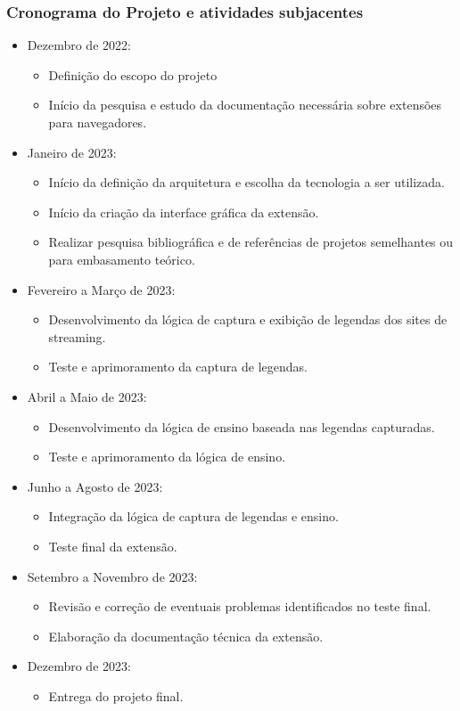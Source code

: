 \documentclass[12pt]{article}
\begin{document}
\subsubsection{Cronograma do Projeto e atividades subjacentes}
\begin{itemize}

\item Dezembro de 2022:
\begin{itemize}
\item Definição do escopo do projeto
\item Início da pesquisa e estudo da documentação necessária sobre extensões para navegadores.
\end{itemize}

\item Janeiro de 2023:
\begin{itemize}
\item Início da definição da arquitetura e escolha da tecnologia a ser utilizada.
\item Início da criação da interface gráfica da extensão.
\item Realizar pesquisa bibliográfica e de referências de projetos semelhantes ou para embasamento teórico.
\end{itemize}

\item Fevereiro a Março de 2023:
\begin{itemize}
\item Desenvolvimento da lógica de captura e exibição de legendas dos sites de streaming.
\item Teste e aprimoramento da captura de legendas.
\end{itemize}

\item Abril a Maio de 2023:
\begin{itemize}
\item Desenvolvimento da lógica de ensino baseada nas legendas capturadas.
\item Teste e aprimoramento da lógica de ensino.
\end{itemize}


\item Junho a Agosto de 2023:
\begin{itemize}
\item Integração da lógica de captura de legendas e ensino.
\item Teste final da extensão.
\end{itemize}

\item Setembro a Novembro de 2023:
\begin{itemize}
\item Revisão e correção de eventuais problemas identificados no teste final.
\item Elaboração da documentação técnica da extensão.
\end{itemize}


\item Dezembro de 2023:
\begin{itemize}
\item Entrega do projeto final.
\end{itemize}

\end{itemize}
\end{document}
